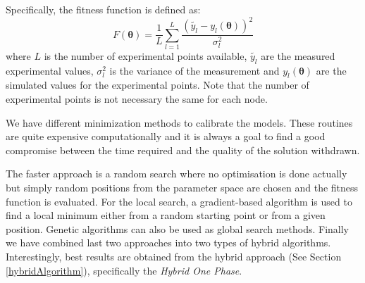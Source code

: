 \documentclass[a4paper, 11pt]{article}
\begin{document}
Specifically, the fitness function is defined as:
\begin{equation} \label{fitnessFunction}
  F(\mathbf{\bm{\theta}}) = \frac{1}{L}\sum_{l=1}^{L}\frac{\left(\tilde{y_{l}} - y_{l}(\bm{\theta})\right)^2}{\sigma_{l}^2}
\end{equation}
where $L$ is the number of experimental points available, $\tilde{y_{l}}$ are the measured experimental values, $\sigma_{l}^2$ is the variance of the measurement and $y_{l}(\bm{\theta})$ are the simulated values for the experimental points.
Note that the number of experimental points is not necessary the same for each node.

We have different minimization methods to calibrate the models.
These routines are quite expensive computationally and it is always a goal to find a good compromise between the time required and the quality of the solution withdrawn.

The faster approach is a random search where no optimisation is done actually but simply random positions from the parameter space are chosen and the fitness function is evaluated.
For the local search, a gradient-based algorithm is used to find a local minimum either from a random starting point or from a given position. 
Genetic algorithms can also be used as global search methods.
Finally we have combined last two approaches into two types of hybrid algorithms.
Interestingly, best results are obtained from the hybrid approach (See Section \ref{hybridAlgorithm}), specifically the \emph{Hybrid One Phase}.
\end{document}

